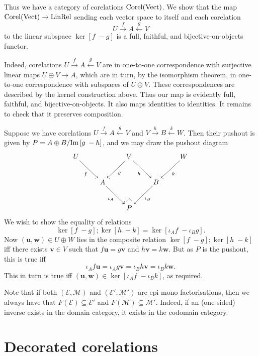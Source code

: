 \begin{example}
  Thus we have a category of corelations $\operatorname{{Corel}}(\mathrm{Vect})$. We show that the map
  $\operatorname{{Corel}}(\mathrm{Vect}) \to \mathrm{LinRel}$ sending each vector space to itself and each
  corelation
  \[
    U \xrightarrow{f} A \xleftarrow{g} V
  \]
  to the linear subspace $\ker[f\;-g]$ is a full, faithful, and
  bijective-on-objects functor.

  Indeed, corelations $U \xrightarrow{f} A \xleftarrow{g} V$ are in one-to-one
  correspondence with surjective linear maps $U\oplus V \to A$, which are in
  turn, by the isomorphism theorem, in one-to-one correspondence with subspaces
  of $U\oplus V$. These correspondences are described by the kernel construction
  above. Thus our map is evidently full, faithful, and bijective-on-objects. It
  also maps identities to identities. It remains to check that it preserves
  composition.

  Suppose we have corelations $U \xrightarrow{f} A \xleftarrow{g} V$
  and $V \xrightarrow{h} B \xleftarrow{k} W$. Then their pushout is given by
  $P=A \oplus B/\mathrm{Im}\,[g\;-h]$, and we may draw the pushout diagram
  \[
    \xymatrix{
      U \ar[dr]_{f} & & V \ar[dl]^{g}  
      \ar[dr]_{h} & & W \ar[dl]^{k} {} 
      \\
      & A \ar[dr]_{\iota_A} & & B \ar[dl]^{\iota_B}  \\
      & & P {\save*!<0cm,-.5cm>[dl]@^{|-}\restore}
    }
  \]
  We wish to show the equality of relations
  \[
    \ker[f\;-g];\ker[h\;-k] = \ker[\iota_A f\; -\iota_B g].
  \]
  Now $(\mathbf{u},\mathbf{w}) \in U \oplus W$ lies in the composite relation
  $\ker[f\;-g];\ker[h\;-k]$ iff there exists $\mathbf{v} \in V$ such that
  $f\mathbf{u} = g\mathbf{v}$ and $h\mathbf{v} = k\mathbf{w}$. But as $P$ is the
  pushout, this is true iff 
  \[
    \iota_A f \mathbf{u} = \iota_A g \mathbf{v} = \iota_B h \mathbf{v} =
    \iota_B k \mathbf{w}.
  \]
  This in turn is true iff $(\mathbf{u}, \mathbf{w}) \in \ker[\iota_Af\;
  -\iota_Bk]$, as required. 
\end{example}

Note that if both $(\mathcal E, \mathcal M)$ and $(\mathcal E', \mathcal M')$
are epi-mono factorisations, then we always have that $F(\mathcal E) \subseteq
\mathcal E'$ and $F(\mathcal M) \subseteq \mathcal M'$. Indeed, if an
(one-sided) inverse exists in the domain category, it exists in the codomain
category.



\section{Decorated corelations} \label{sec:dcorc}

